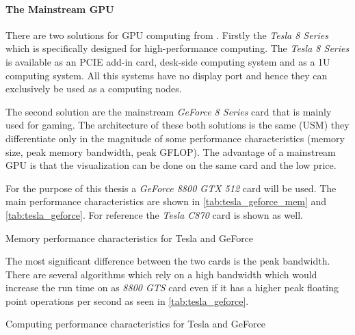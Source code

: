 \paragraph{The Mainstream GPU} %
\label{par:the_mainstream_gpu}
There are two solutions for \gls{GPU} computing from {}. Firstly the
\emph{Tesla 8 Series} which is specifically designed for high-performance
computing. The \emph{Tesla 8 Series} is available as an \gls{PCIE} add-in card,
desk-side computing system and as a \gls{1U} computing system. All this systems have
no display port and hence they can exclusively be used as a computing nodes. 

The second solution are the mainstream \emph{GeForce 8 Series} card that
is mainly used for gaming. The architecture of these both solutions is the same
(\gls{USM}) they differentiate only in the magnitude of some performance
characteristics (memory size, peak memory bandwidth, peak \gls{GFLOP}). The
advantage of a mainstream \gls{GPU} is that the visualization can be done on the
same card and the low price. 

For the purpose of this thesis a \emph{GeForce 8800 GTX 512} card will be
used. The main performance characteristics are shown in
\autoref{tab:tesla_geforce_mem} and \autoref{tab:tesla_geforce}. For reference
the \emph{Tesla C870} card is shown as well.

\begin{table}[ht]
	\centering
  	\caption{Memory performance characteristics for Tesla and GeForce}
  	\label{tab:tesla_geforce_mem}
\end{table}

The most significant difference between the two cards is the peak bandwidth. There
are several algorithms which rely on a high bandwidth which would increase the
run time on as \emph{8800 GTS} card even if it has a higher peak floating
point operations per second as seen in  \autoref{tab:tesla_geforce}. 

\begin{table}[ht]
	\centering
  	\caption{Computing performance characteristics for Tesla and GeForce}
  	\label{tab:tesla_geforce}
\end{table}

